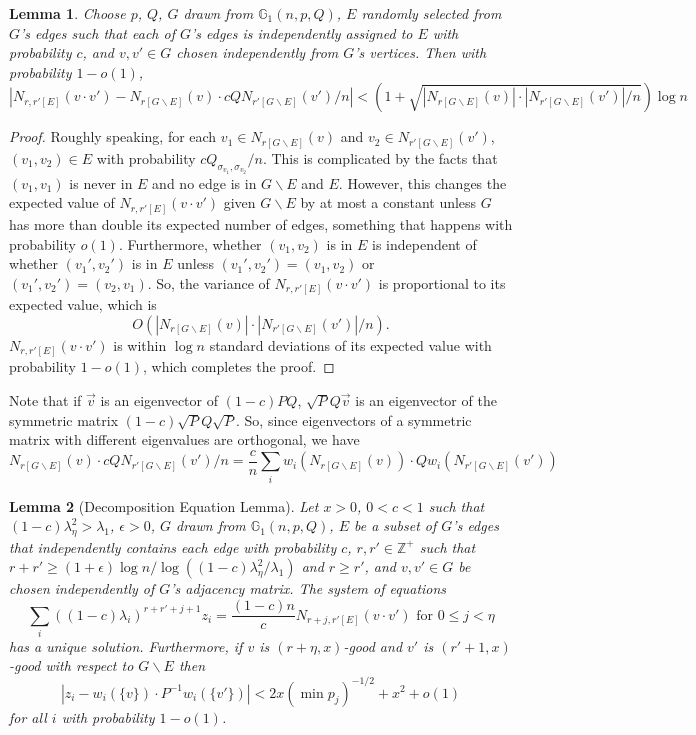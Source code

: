 \documentclass[11pt]{article}
\newcommand{\gss}{\mathbb{G}_1}
\newcommand{\1}{\mathbb{1}}
\newtheorem{lemma}{Lemma}
\begin{document}
\begin{lemma}
Choose $p$, $Q$, $G$ drawn from $\gss(n,p,Q)$, $E$ randomly selected from $G$'s edges such that each of $G$'s edges is independently assigned to $E$ with probability $c$, and $v,v'\in G$ chosen independently from $G$'s vertices. Then with probability $1-o(1)$, \[|N_{r,r'[E]}(v\cdot v')-N_{r[G\backslash E]}(v)\cdot cQN_{r'[G\backslash E]}(v')/n|<(1+\sqrt{|N_{r[G\backslash E]}(v)|\cdot |N_{r'[G\backslash E]}(v')|/n})\log n\]
\end{lemma}

\begin{proof}
Roughly speaking, for each $v_1\in N_{r[G\backslash E]}(v)$ and $v_2\in N_{r'[G\backslash E]}(v')$, $(v_1,v_2)\in E$ with probability $cQ_{\sigma_{v_1},\sigma_{v_2}}/n$. This is complicated by the facts that $(v_1,v_1)$ is never in $E$ and no edge is in $G\backslash E$ and $E$. However, this changes the expected value of $N_{r,r'[E]}(v\cdot v')$ given $G\backslash E$ by at most a constant unless $G$ has more than double its expected number of edges, something that happens with probability $o(1)$. Furthermore, whether $(v_1,v_2)$ is in $E$ is independent of whether $(v_1',v_2')$ is in $E$ unless $(v_1',v_2')=(v_1,v_2)$ or $(v_1',v_2')=(v_2,v_1)$. So, the variance of  $N_{r,r'[E]}(v\cdot v')$ is proportional to its expected value, which is $$O(|N_{r[G\backslash E]}(v)|\cdot |N_{r'[G\backslash E]}(v')|/n).$$ $N_{r,r'[E]}(v\cdot v')$ is within $\log n$ standard deviations of its expected value with probability $1-o(1)$, which completes the proof.
\end{proof}

Note that if $\overrightarrow{v}$ is an eigenvector of $(1-c)PQ$, $\sqrt{P}Q\overrightarrow{v}$ is an eigenvector of the symmetric matrix $(1-c)\sqrt{P}Q\sqrt{P}$. So, since eigenvectors of a symmetric matrix with different eigenvalues are orthogonal, we have \[N_{r[G\backslash E]}(v)\cdot cQN_{r'[G\backslash E]}(v')/n=\frac{c}{n} \sum_i w_i(N_{r[G\backslash E]}(v))\cdot Qw_i(N_{r'[G\backslash E]}(v'))\] 

\begin{lemma}[Decomposition Equation Lemma]
Let $x>0$, $0<c<1$ such that $(1-c)\lambda_{\eta}^2>\lambda_1$, $\epsilon>0$, $G$ drawn from $\gss(n,p,Q)$, $E$ be a subset of $G$'s edges that independently contains each edge with probability $c$, $r, r'\in\mathbb{Z}^+$ such that $r+r'\ge (1+\epsilon)\log n/\log((1-c)\lambda_{\eta}^2/\lambda_1)$ and $r\ge r'$, and $v,v'\in G$ be chosen independently of $G$'s adjacency matrix. The system of equations \[\sum_i ((1-c)\lambda_i)^{r+r'+j+1}z_i=\frac{(1-c)n}{c}N_{r+j,r'[E]}(v\cdot v') \text{ for } 0\le j<\eta\] has a unique solution. Furthermore, if $v$ is $(r+\eta,x)$-good and $v'$ is $(r'+1,x)$-good with respect to $G\backslash E$ then \[|z_i-w_i(\{v\})\cdot P^{-1}w_i(\{v'\})|<2x(\min p_j)^{-1/2}+x^2+o(1)\] for all $i$ with probability $1-o(1)$.
\end{lemma}
\end{document}
